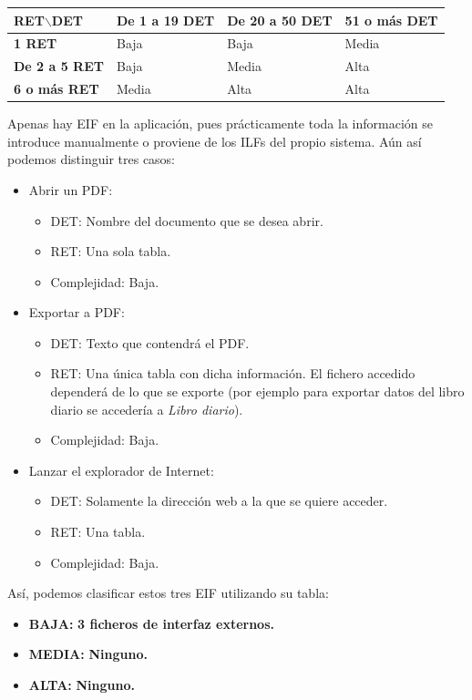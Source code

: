 \documentclass[spanish,a4paper,11pt, twoside]{report}	%
\begin{document}
			\begin{tabular}{|p{3cm}||p{3cm}|p{3.2cm}|p{3cm}|}
				\hline
				\textbf{RET$\backslash$DET} & \textbf{De 1 a 19 DET} & \textbf{De 20 a 50 DET} & \textbf{51  o más DET} \\ \hline \hline
				\textbf{1 RET} & Baja & Baja & Media \\ \hline 
				\textbf{De 2 a 5 RET} & Baja & Media & Alta \\ \hline 
				\textbf{6 o más RET} & Media & Alta & Alta \\ \hline 
			\end{tabular}

\vspace{0.35cm}

	Apenas hay EIF en la aplicación, pues prácticamente toda la información se introduce manualmente o proviene de los ILFs del propio sistema. Aún así podemos distinguir tres casos:
	\begin{itemize}
		\item{Abrir un PDF:} 
		\begin{itemize}
 			\item{DET:} Nombre del documento que se desea abrir.
			\item{RET:} Una sola tabla.
			\item{Complejidad:} Baja.
		\end{itemize}		
		\item{Exportar a PDF:} 
		\begin{itemize}
 			\item{DET:} Texto que contendrá el PDF.
			\item{RET:} Una única tabla con dicha información. El fichero accedido dependerá de lo que se exporte (por ejemplo para exportar datos del libro diario se accedería a \textit{Libro diario}).
			\item{Complejidad:} Baja.
		\end{itemize}
		\item{Lanzar el explorador de Internet:} 
		\begin{itemize}
 			\item{DET:} Solamente la dirección web a la que se quiere acceder.
			\item{RET:} Una tabla.
			\item{Complejidad:} Baja.
		\end{itemize}
	\end{itemize}

	Así, podemos clasificar estos tres EIF utilizando su tabla:
	\begin{itemize}
	\item{\textbf{BAJA:}} \textbf{3 ficheros de interfaz externos.}
	\item{\textbf{MEDIA:}} \textbf{Ninguno.}
	\item{\textbf{ALTA:}} \textbf{Ninguno.}
	\end{itemize}
\end{document}
